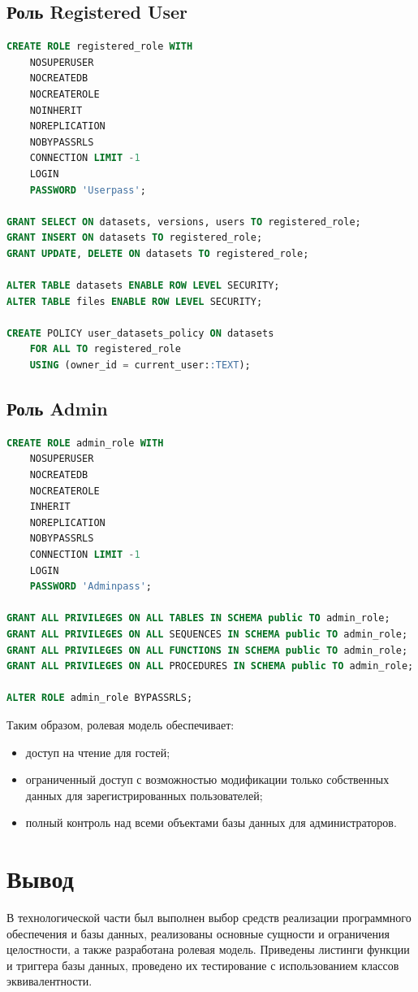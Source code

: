 \subsection*{Роль Registered User}

\begin{lstlisting}[language=SQL,caption={Создание роли Registered User}]
CREATE ROLE registered_role WITH
    NOSUPERUSER
    NOCREATEDB
    NOCREATEROLE
    NOINHERIT
    NOREPLICATION
    NOBYPASSRLS
    CONNECTION LIMIT -1
    LOGIN
    PASSWORD 'Userpass';

GRANT SELECT ON datasets, versions, users TO registered_role;
GRANT INSERT ON datasets TO registered_role;
GRANT UPDATE, DELETE ON datasets TO registered_role;

ALTER TABLE datasets ENABLE ROW LEVEL SECURITY;
ALTER TABLE files ENABLE ROW LEVEL SECURITY;

CREATE POLICY user_datasets_policy ON datasets
    FOR ALL TO registered_role
    USING (owner_id = current_user::TEXT);
\end{lstlisting}


\subsection*{Роль Admin}

\begin{lstlisting}[language=SQL,caption={Создание роли Admin}]
CREATE ROLE admin_role WITH
    NOSUPERUSER
    NOCREATEDB
    NOCREATEROLE
    INHERIT
    NOREPLICATION
    NOBYPASSRLS
    CONNECTION LIMIT -1
    LOGIN
    PASSWORD 'Adminpass';

GRANT ALL PRIVILEGES ON ALL TABLES IN SCHEMA public TO admin_role;
GRANT ALL PRIVILEGES ON ALL SEQUENCES IN SCHEMA public TO admin_role;
GRANT ALL PRIVILEGES ON ALL FUNCTIONS IN SCHEMA public TO admin_role;
GRANT ALL PRIVILEGES ON ALL PROCEDURES IN SCHEMA public TO admin_role;

ALTER ROLE admin_role BYPASSRLS;
\end{lstlisting}

Таким образом, ролевая модель обеспечивает:
\begin{itemize}
    \item доступ на чтение для гостей;
    \item ограниченный доступ с возможностью модификации только собственных данных для зарегистрированных пользователей;
    \item полный контроль над всеми объектами базы данных для администраторов.
\end{itemize}

\section*{Вывод}


В технологической части был выполнен выбор средств реализации
программного обеспечения и базы данных, реализованы основные
сущности и ограничения целостности, а также разработана ролевая
модель. Приведены листинги функции и триггера базы данных,
проведено их тестирование с использованием классов эквивалентности.

